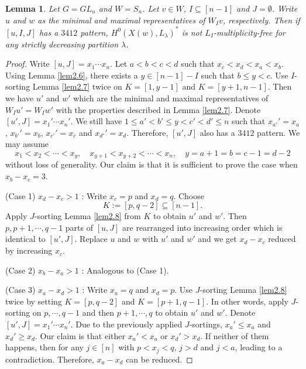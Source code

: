 \documentclass[12pt]{amsart}
\newtheorem{lemma}[theorem]{Lemma}
\theoremstyle{definition}
\theoremstyle{remark}
\begin{document}
\begin{lemma}\label{lem4.7}
Let $G= GL_n$ and $W= S_n$. Let $v \in W$, $I \subseteq [n-1]$ and $J=\emptyset$. Write $u$ and $w$ as the minimal and maximal representatives of $W_I v$, respectively. Then if $[u,I,J]$ has a $3412$ pattern, $H^0(X(w),L_\lambda)^*$ is not $L_I$-multiplicity-free for any strictly decreasing partition $\lambda$.
\end{lemma}
\begin{proof}
Write $[u,J] = x_1 \cdots x_n$. Let $a < b < c < d$ such that $x_c < x_d < x_a < x_b$. Using Lemma \ref{lem2.6}, there exists a $y \in [n-1]-I$ such that $b \leq y < c$. Use $I$-sorting Lemma \ref{lem2.7} twice on $K = [1,y-1]$ and $K = [y+1,n-1]$. Then we have $u'$ and $w'$ which are the minimal and maximal representatives of $W_Iu' = W_I w'$ with the properties described in Lemma \ref{lem2.7}. Denote $[u',J]= x_1' \cdots x_n '$. We still have $1 \leq a' < b' \leq y < c' < d' \leq n$ such that $x_{a'}' = x_a$, $x_{b'}' = x_b$, $x_{c'}' = x_c$ and $x_{d'}' = x_d$. Therefore, $[u',J]$ also has a $3412$ pattern. We may assume
\begin{equation}\label{eqn4.10}
x_1 < x_2 < \cdots < x_{y}, \quad x_{y+1} < x_{y+2} < \cdots < x_n, \quad y=a+1 = b = c-1 = d-2
\end{equation}
without loss of generality. Our claim is that it is sufficient to prove the case when $x_b - x_c = 3$.

(Case 1) $x_d - x_c >1$ : Write $x_c = p$ and $x_d = q$. Choose
\begin{equation}\label{eqn4.9}
K:= [ p ,  q-2 ] \subseteq [n-1].
\end{equation}
Apply $J$-sorting Lemma \ref{lem2.8} from $K$ to obtain $u'$ and $w'$. Then $p , p+1 , \cdots , q-1$ parts of $[u,J]$ are rearranged into increasing order which is identical to $[u',J]$. Replace $u$ and $w$ with $u'$ and $w'$ and we get $x_d - x_c $ reduced by increasing $x_c$.

(Case 2) $x_b - x_a>1$ : Analogous to (Case 1).

(Case 3) $x_a - x_d >1$ : Write $x_a = q$ and $x_d = p$. Use $J$-sorting Lemma \ref{lem2.8} twice by setting $K = [p, q-2]$ and $K = [p+1 , q-1]$. In other words, apply $J$-sorting on $p, \cdots , q-1$ and then $p+1, \cdots , q$ to obtain $u'$ and $w'$. Denote $[u',J] = x_1' \cdots x_n'$. Due to the previously applied $J$-sortings, $x_a' \leq x_a$ and $x_d' \geq x_d$. Our claim is that either $x_a ' < x_a$ or $x_d' > x_d$. If neither of them happens, then for any $j \in [n]$ with $p < x_j <q$, $j >d$ and $j <a$, leading to a contradiction. Therefore, $x_a - x_d$ can be reduced.


\end{proof}
\end{document}
